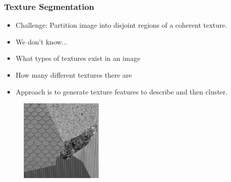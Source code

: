 \documentclass{beamer}
\begin{document}
\begin{frame}
  \frametitle{Texture Segmentation}
  \begin{itemize}
 \item Challenge: Partition image into disjoint regions of a coherent texture. 
\item We don't know...
\item What types of textures exist in an image
\item How many different textures there are
 
\item Approach is to generate texture features to describe and then cluster. 

  \end{itemize}
  \begin{figure}[h]
    \centering
    \includegraphics[width = 4cm]{tm3_1_1}
  \end{figure}

\end{frame}
\end{document}
